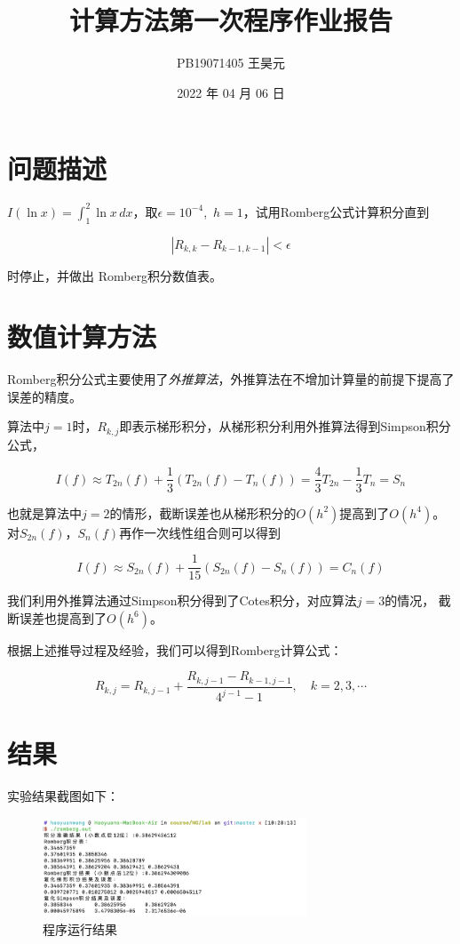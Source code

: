 \documentclass{article}
\title{计算方法第一次程序作业报告}
\author{PB19071405 王昊元}
\date{2022 年 04 月 06 日}
\begin{document}
\maketitle

\section{问题描述}

$I(\ln x) = \int_{1}^{2}\ln x\, dx$，取$\epsilon = 10^{-4}$,\ $h = 1$，试用Romberg公式计算积分直到

$$|R_{k, k} - R_{k - 1, k - 1}| < \epsilon$$

时停止，并做出 Romberg积分数值表。

\section{数值计算方法}

Romberg积分公式主要使用了\emph{外推算法}，外推算法在不增加计算量的前提下提高了误差的精度。

算法中$j = 1$时，$R_{k, j}$即表示梯形积分，从梯形积分利用外推算法得到Simpson积分公式，

$$I(f) \approx T_{2n}(f) + \frac{1}{3}(T_{2n}(f) - T_n(f)) = \frac{4}{3}T_{2n} - \frac{1}{3}T_n = S_n$$

也就是算法中$j = 2$的情形，截断误差也从梯形积分的$O(h^2)$提高到了$O(h^4)$。
对$S_{2n}(f)$，$S_n(f)$再作一次线性组合则可以得到

$$I(f) \approx S_{2n}(f) + \frac{1}{15}(S_{2n}(f) - S_n(f)) = C_n(f)$$

我们利用外推算法通过Simpson积分得到了Cotes积分，对应算法$j = 3$的情况，
截断误差也提高到了$O(h^6)$。

根据上述推导过程及经验，我们可以得到Romberg计算公式：

$$R_{k, j} = R_{k, j - 1} + \frac{R_{k, j-1} - R_{k-1, j-1}}{4^{j-1} - 1},\quad k=2,3,\cdots$$

\section{结果}

实验结果截图如下：

\begin{figure}[H]
    \centering
    \includegraphics[width=0.7\textwidth]{./figs/lab1_result.jpg}
    \caption{程序运行结果}
    \label{program result}
\end{figure}
\end{document}
